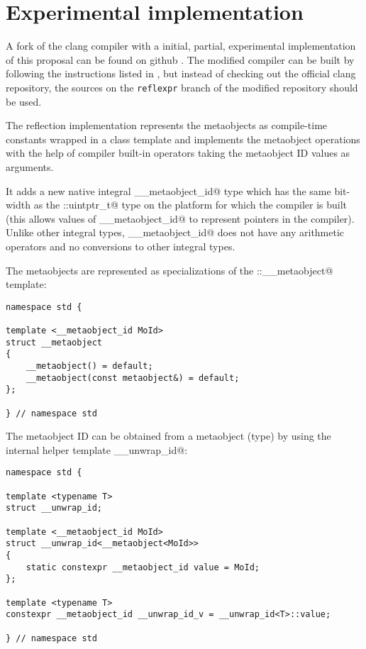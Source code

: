 \section{Experimental implementation}
\label{implementation}

A fork of the clang compiler with a initial, partial, experimental implementation
of this proposal can be found on github \cite{ReflexprImplementation}.
The modified compiler can be built by following the instructions listed
in \cite{ClangGettingStarted}, but instead of checking out the official clang
repository, the sources on the \texttt{reflexpr} branch of the modified
repository should be used.

The reflection implementation represents the metaobjects as compile-time
constants wrapped in a class template and implements the metaobject operations
with the help of compiler built-in operators taking the metaobject ID values
as arguments. 

It adds a new native integral \verb@__metaobject_id@ type which has the same
bit-width as the \verb@std::uintptr_t@ type on the platform for which
the compiler is built (this allows values of \verb@__metaobject_id@ to represent
pointers in the compiler). Unlike other integral types, \verb@__metaobject_id@
does not have any arithmetic operators and no conversions to other integral types. 

The metaobjects are represented as specializations of the \verb@std::__metaobject@
template: 

\begin{verbatim}
namespace std {

template <__metaobject_id MoId>
struct __metaobject
{
	__metaobject() = default;
	__metaobject(const metaobject&) = default;
};

} // namespace std
\end{verbatim}

The metaobject ID can be obtained from a metaobject (type) by using the internal
helper template \verb@__unwrap_id@: 

\begin{verbatim}
namespace std {

template <typename T>
struct __unwrap_id;

template <__metaobject_id MoId>
struct __unwrap_id<__metaobject<MoId>>
{
	static constexpr __metaobject_id value = MoId;
};

template <typename T>
constexpr __metaobject_id __unwrap_id_v = __unwrap_id<T>::value;

} // namespace std
\end{verbatim}

